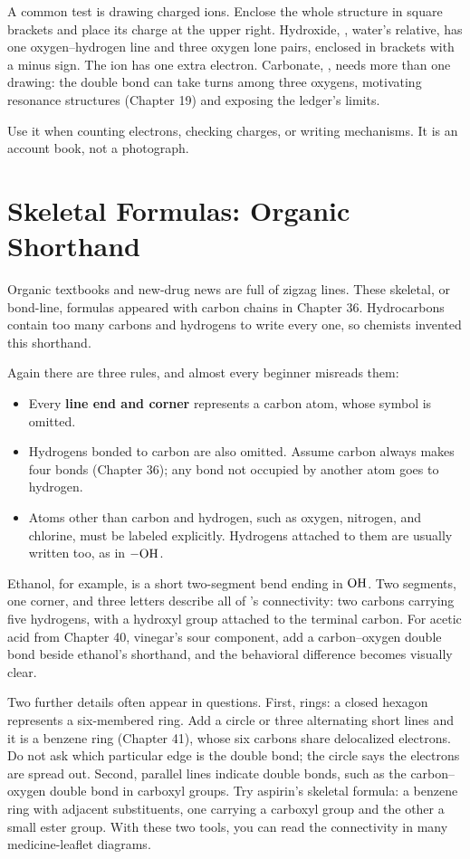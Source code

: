 A common test is drawing charged ions. Enclose the whole structure in square brackets and place its charge at the upper right. Hydroxide, , water's relative, has one oxygen--hydrogen line and three oxygen lone pairs, enclosed in brackets with a minus sign. The ion has one extra electron. Carbonate, , needs more than one drawing: the double bond can take turns among three oxygens, motivating resonance structures (Chapter 19) and exposing the ledger's limits.

Use it when counting electrons, checking charges, or writing mechanisms. It is an account book, not a photograph.

\section{Skeletal Formulas: Organic Shorthand}

Organic textbooks and new-drug news are full of zigzag lines. These skeletal, or bond-line, formulas appeared with carbon chains in Chapter 36. Hydrocarbons contain too many carbons and hydrogens to write every one, so chemists invented this shorthand.

Again there are three rules, and almost every beginner misreads them:

\begin{itemize}[itemsep=2pt]
\item Every \textbf{line end and corner} represents a carbon atom, whose symbol is omitted.
\item Hydrogens bonded to carbon are also omitted. Assume carbon always makes four bonds (Chapter 36); any bond not occupied by another atom goes to hydrogen.
\item Atoms other than carbon and hydrogen, such as oxygen, nitrogen, and chlorine, must be labeled explicitly. Hydrogens attached to them are usually written too, as in $-\mathrm{OH}$.
\end{itemize}

Ethanol, for example, is a short two-segment bend ending in $\mathrm{OH}$. Two segments, one corner, and three letters describe all of 's connectivity: two carbons carrying five hydrogens, with a hydroxyl group attached to the terminal carbon. For acetic acid from Chapter 40, vinegar's sour component, add a carbon--oxygen double bond beside ethanol's shorthand, and the behavioral difference becomes visually clear.

Two further details often appear in questions. First, rings: a closed hexagon represents a six-membered ring. Add a circle or three alternating short lines and it is a benzene ring (Chapter 41), whose six carbons share delocalized electrons. Do not ask which particular edge is the double bond; the circle says the electrons are spread out. Second, parallel lines indicate double bonds, such as the carbon--oxygen double bond in carboxyl groups. Try aspirin's skeletal formula: a benzene ring with adjacent substituents, one carrying a carboxyl group and the other a small ester group. With these two tools, you can read the connectivity in many medicine-leaflet diagrams.

